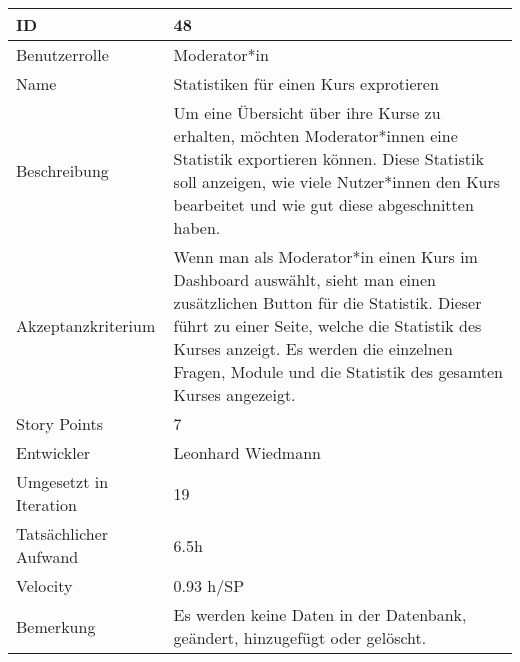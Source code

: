 \begin{tabularx}{\textwidth}{|p{}|X|}
	\hline
	ID & 48\\
	\hline
	Benutzerrolle & Moderator*in\\
	\hline
	Name & Statistiken für einen Kurs exprotieren\\
	\hline
	Beschreibung & Um eine Übersicht über ihre Kurse zu erhalten, möchten Moderator*innen eine Statistik exportieren können. Diese Statistik soll anzeigen, wie viele Nutzer*innen den Kurs bearbeitet und wie gut diese abgeschnitten haben.\\
	\hline
	Akzeptanzkriterium & Wenn man als Moderator*in einen Kurs im Dashboard auswählt, sieht man einen zusätzlichen Button für die Statistik. Dieser führt zu einer Seite, welche die Statistik des Kurses anzeigt. Es werden die einzelnen Fragen, Module und die Statistik des gesamten Kurses angezeigt.\\
	\hline
	Story Points & 7\\
	\hline
	Entwickler & Leonhard Wiedmann\\
	\hline
	Umgesetzt in Iteration & 19\\
	\hline
	Tatsächlicher Aufwand & 6.5h \\
	\hline
	Velocity & 0.93 h/SP\\
	\hline
	Bemerkung & Es werden keine Daten in der Datenbank, geändert, hinzugefügt oder gelöscht.\\
	\hline
\end{tabularx}
\vspace{20pt}
